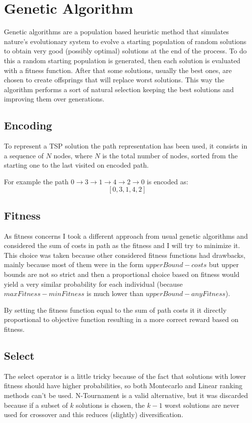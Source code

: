 \section{Genetic Algorithm}
	Genetic algorithms are a population based heuristic method that simulates nature's evolutionary system to evolve a starting population of random solutions to obtain very good (possibly optimal) solutions at the end of the process. To do this a random starting population is generated, then each solution is evaluated with a fitness function. After that some solutions, usually the best ones, are chosen to create offsprings that will replace worst solutions. This way the algorithm performs a sort of natural selection keeping the best solutions and improving them over generations.
		
	\subsection{Encoding}
		To represent a TSP solution the path representation has been used, it consists in a sequence of $N$ nodes, where $N$ is the total number of nodes, sorted from the starting one to the last visited on encoded path.
		
		For example the path $0 \rightarrow 3 \rightarrow 1 \rightarrow 4 \rightarrow 2 \rightarrow 0$ is encoded as:
		\[[0, 3, 1, 4, 2]\]
	
	\subsection{Fitness}
		As fitness concerns I took a different approach from usual genetic algorithms and considered the sum of costs in path as the fitness and I will try to minimize it.
		This choice was taken because other considered fitness functions had drawbacks, mainly because most of them were in the form $upperBound - costs$ but upper bounds are not so strict and then a proportional choice based on fitness would yield a very similar probability for each individual (because $maxFitness - minFitness$ is much lower than $upperBound - anyFitness$).
		
		By setting the fitness function equal to the sum of path costs it it directly proportional to objective function resulting in a more correct reward based on fitness.
		
	\subsection{Select}
		The select operator is a little tricky because of the fact that solutions with lower fitness should have higher probabilities, so both Montecarlo and Linear ranking methods can't be used. N-Tournament is a valid alternative, but it was discarded because if a subset of $k$ solutions is chosen, the $k-1$ worst solutions are never used for crossover and this reduces (slightly) diversification.
		
